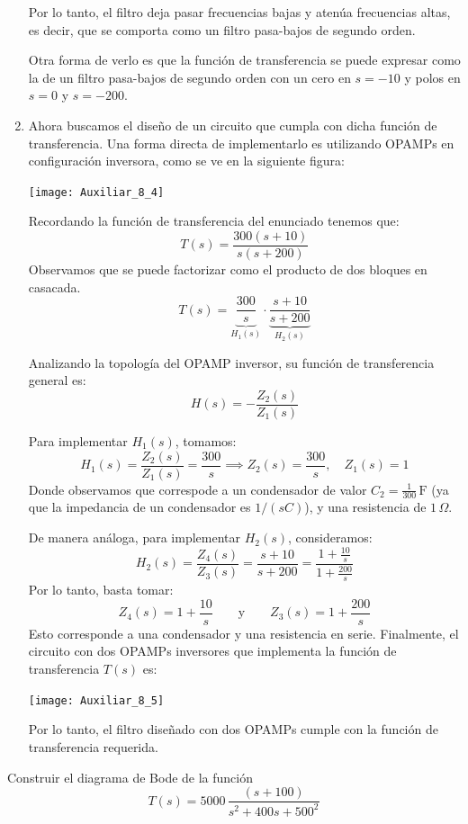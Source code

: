 \documentclass[
  11pt,
  letterpaper,
   addpoints,
   answers
  ]{exam}
\begin{document}
\begin{questions}
\begin{solution}
\begin{enumerate}
Por lo tanto, el filtro deja pasar frecuencias bajas y atenúa frecuencias altas, es decir, que se comporta como un filtro pasa-bajos de segundo orden.

Otra forma de verlo es que la función de transferencia se puede expresar como la de un filtro pasa-bajos de segundo orden con un cero en \( s = -10 \) y polos en \( s = 0 \) y \( s = -200 \).
    \item  Ahora buscamos el diseño de un circuito que cumpla con dicha función de transferencia. Una forma directa de implementarlo es utilizando OPAMPs en configuración inversora, como se ve en la siguiente figura:
\begin{center}
    \texttt{[image: Auxiliar\_8\_4]}
\end{center}

Recordando la función de transferencia del enunciado tenemos que:
\[
T(s) = \frac{300(s+10)}{s(s+200)}
\]
Observamos que se puede factorizar como el producto de dos bloques en casacada.
\[
T(s) = \underbrace{\frac{300}{s}}_{H_1(s)} \cdot \underbrace{\frac{s+10}{s+200}}_{H_2(s)}
\]

Analizando la topología del OPAMP inversor, su función de transferencia general es:
\[
H(s) = -\frac{Z_2(s)}{Z_1(s)}
\]

Para implementar \( H_1(s) \), tomamos:
\[
H_1(s) = \frac{Z_2(s)}{Z_1(s)} = \frac{300}{s}
\implies Z_2(s) = \frac{300}{s}, \quad Z_1(s) = 1
\]
Donde observamos que correspode a un condensador de valor \( C_2 = \frac{1}{300} \,\text{F} \) (ya que la impedancia de un condensador es \( 1/(sC) \)), y una resistencia de \( 1\,\Omega \).

De manera análoga, para implementar \( H_2(s) \), consideramos:
\[
H_2(s) = \frac{Z_4(s)}{Z_3(s)} = \frac{s+10}{s+200}
= \frac{1 + \frac{10}{s}}{1 + \frac{200}{s}}
\]
Por lo tanto, basta tomar:
\[
Z_4(s) = 1 + \frac{10}{s} \qquad \text{y} \qquad Z_3(s) = 1 + \frac{200}{s}
\]
Esto corresponde a una condensador y una resistencia en serie. Finalmente, el circuito con dos OPAMPs inversores que implementa la función de transferencia \( T(s) \) es:

\begin{center}
\texttt{[image: Auxiliar\_8\_5]}
\end{center}

Por lo tanto, el filtro diseñado con dos OPAMPs cumple con la función de transferencia requerida.
    \end{enumerate}
\end{solution}
\question Construir el diagrama de Bode de la función
\begin{equation}
    T(s) = 5000\,\frac{(s + 100)}{s^2 + 400s + 500^2}
\end{equation}


\end{questions}
\end{document}
